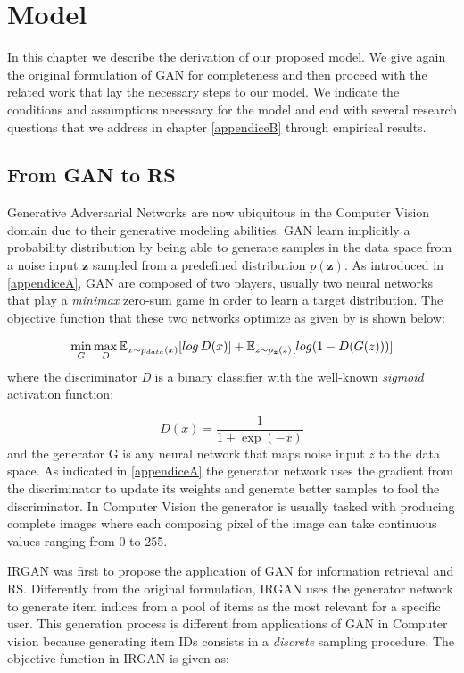 \chapter{Model}
\label{model}
\thispagestyle{empty}

In this chapter we describe the derivation of our proposed model. We give again the original formulation of GAN for completeness and then proceed with the related work that lay the necessary steps to our model. We indicate the conditions and assumptions necessary for the model and end with several research questions that we address in chapter \ref{appendiceB} through empirical results.

\section{From GAN to RS}
\label{from_gan_to_rs}
Generative Adversarial Networks \cite{goodfellow2014generative} are now ubiquitous in the Computer Vision domain due to their generative modeling abilities. GAN learn implicitly a probability distribution by being able to generate samples in the data space from a noise input $\textbf{z}$ sampled from a predefined distribution $p(\textbf{z})$. As introduced in \ref{appendiceA}, GAN are composed of two players, usually two neural networks that play a \emph{minimax} zero-sum game in order to learn a target distribution. The objective function that these two networks optimize as given by \cite{goodfellow2014generative} is shown below:

\[
    \min_{G} \max_{D} \operatorname{\mathbb{E}}_{x\sim{p_{data}(x)}} [log \, D(x)] + \operatorname{\mathbb{E}}_{z\sim{p_{\boldsymbol{z}}(z)}} [log(1-D(G(z)))]
\]
where the discriminator \emph{D} is a binary classifier with the well-known \emph{sigmoid} activation function:

\[
    D(x) = \frac{1}{1 + \exp(-x)}
\]
and the generator G is any neural network that maps noise input $z$ to the data space. As indicated in \ref{appendiceA} the generator network uses the gradient from the discriminator to update its weights and generate better samples to fool the discriminator. In Computer Vision the generator is usually tasked with producing complete images where each composing pixel of the image can take continuous values ranging from 0 to 255.

IRGAN \cite{wang2017irgan} was first to propose the application of GAN for information retrieval and RS. Differently from the original formulation, IRGAN uses the generator network to generate item indices from a pool of items as the most relevant for a specific user. This generation process is different from applications of GAN in Computer vision because generating item IDs consists in a \emph{discrete} sampling procedure. The objective function in IRGAN is given as:

